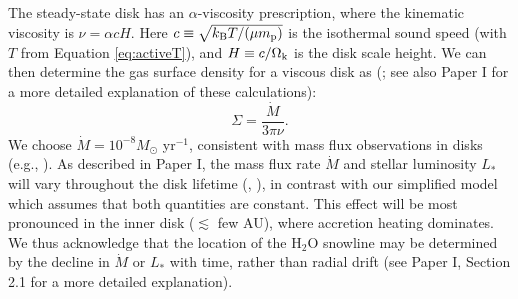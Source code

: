\documentclass[apj]{emulateapj}
\begin{document}

The steady-state disk has an $\alpha$-viscosity prescription, where the kinematic viscosity is $\nu=\alpha c H$. Here $c \equiv \sqrt{k_{\rm B} T /(\mu m_{\rm p})}$ is the isothermal sound speed (with $T$ from Equation \ref{eq:activeT}), and $H \equiv c/\Omega_{\rm k}$ is the disk scale height. We can then determine the gas surface density for a viscous disk as (\citealt{shakura73}; see also Paper I for a more detailed explanation of these calculations):
\begin{equation}
\label{eq:Sigmaact}
\Sigma=\frac{\dot{M}}{3 \pi \nu}.
\end{equation}
We choose $\dot{M}=10^{-8} M_{\odot}$ yr$^{-1}$, consistent with mass flux observations in disks (e.g., \citealt{andrews10}). As described in Paper I, the mass flux rate $\dot{M}$ and stellar luminosity $L_*$ will vary throughout the disk lifetime (\citealt{kennedy06}, \citealt{chambers09}), in contrast with our simplified model which assumes that both quantities are constant. This effect will be most pronounced in the inner disk ($\lesssim$ few AU), where accretion heating dominates. We thus acknowledge that the location of the H$_2$O snowline may be determined by the decline in $\dot{M}$ or $L_*$ with time, rather than radial drift (see Paper I, Section 2.1 for a more detailed explanation). 

%
\end{document}

